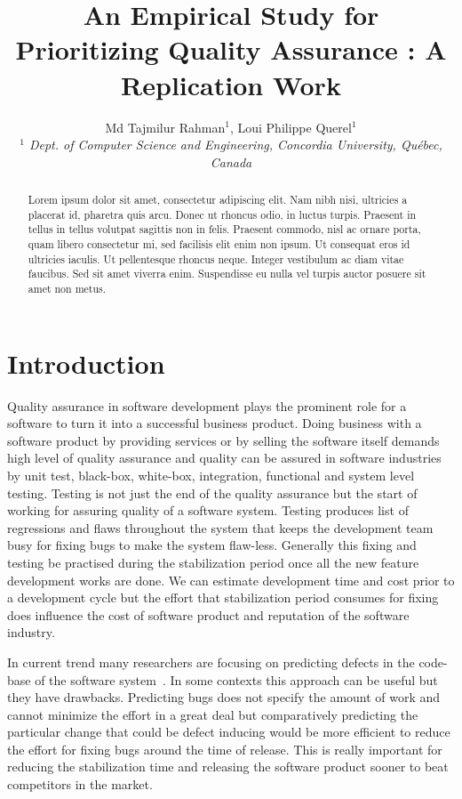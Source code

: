 \documentclass[10pt, conference]{IEEEtran}
\title{An Empirical Study for Prioritizing Quality Assurance : A Replication Work}
\author{Md Tajmilur Rahman$^{1}$, Loui Philippe Querel$^{1}$
    \\
	\emph{$^{1}$ Dept. of Computer Science and Engineering, Concordia University, Qu\'{e}bec, Canada}
}
\begin{document}
\maketitle

\begin{abstract}
Lorem ipsum dolor sit amet, consectetur adipiscing elit. Nam nibh nisi, ultricies a placerat id, pharetra quis arcu. Donec ut rhoncus odio, in luctus turpis. Praesent in tellus in tellus volutpat sagittis non in felis. Praesent commodo, nisl ac ornare porta, quam libero consectetur mi, sed facilisis elit enim non ipsum. Ut consequat eros id ultricies iaculis. Ut pellentesque rhoncus neque. Integer vestibulum ac diam vitae faucibus. Sed sit amet viverra enim. Suspendisse eu nulla vel turpis auctor posuere sit amet non metus.
\end{abstract}

\section{Introduction}
\label{sec:introduction}

Quality assurance in software development plays the prominent role for a software to turn it into a successful business product. Doing business with a software product by providing services or by selling the software itself demands high level of quality assurance and quality can be assured in software industries by unit test, black-box, white-box, integration, functional and system level testing. Testing is not just the end of the quality assurance but the start of working for assuring quality of a software system. Testing produces list of regressions and flaws throughout the system that keeps the development team busy for fixing bugs to make the system flaw-less. Generally this fixing and testing be practised during the stabilization period once all the new feature development works are done. We can estimate development time and cost prior to a development cycle but the effort that stabilization period consumes for fixing does influence the cost of software product and reputation of the software industry. 

In current trend many researchers are focusing on predicting defects in the code-base of the software system~\cite{Gyimothy2005IEEE}. In some contexts this approach can be useful but they have drawbacks. Predicting bugs does not specify the amount of work and cannot minimize the effort in a great deal but comparatively predicting the particular change that could be defect inducing would be more efficient to reduce the effort for fixing bugs around the time of release. This is really important for reducing the stabilization time and releasing the software product sooner to beat competitors in the market.
\end{document}
